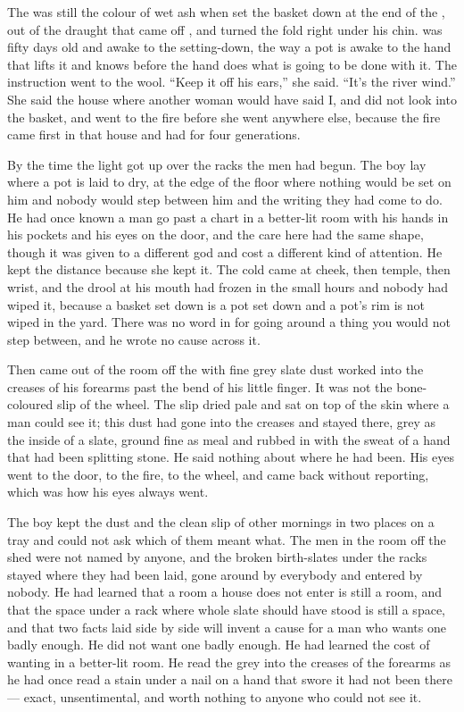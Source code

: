 
The  was still the colour of wet ash when  set the basket down at the end of the , out of the draught that came off , and turned the fold right under his chin.  was fifty days old and awake to the setting-down, the way a pot is awake to the hand that lifts it and knows before the hand does what is going to be done with it. The instruction went to the wool. “Keep it off his ears,” she said. “It's the river wind.” She said the house where another woman would have said I, and did not look into the basket, and went to the fire before she went anywhere else, because the fire came first in that house and had for four generations.

By the time the light got up over the racks the men had begun. The boy lay where a pot is laid to dry, at the edge of the floor where nothing would be set on him and nobody would step between him and the writing they had come to do. He had once known a man go past a chart in a better-lit room with his hands in his pockets and his eyes on the door, and the care here had the same shape, though it was given to a different god and cost a different kind of attention. He kept the distance because she kept it. The cold came at cheek, then temple, then wrist, and the drool at his mouth had frozen in the small hours and nobody had wiped it, because a basket set down is a pot set down and a pot's rim is not wiped in the yard. There was no word in  for going around a thing you would not step between, and he wrote no cause across it.

Then  came out of the room off the  with fine grey slate dust worked into the creases of his forearms past the bend of his little finger. It was not the bone-coloured slip of the wheel. The slip dried pale and sat on top of the skin where a man could see it; this dust had gone into the creases and stayed there, grey as the inside of a slate, ground fine as meal and rubbed in with the sweat of a hand that had been splitting stone. He said nothing about where he had been. His eyes went to the door, to the fire, to the wheel, and came back without reporting, which was how his eyes always went.

The boy kept the dust and the clean slip of other mornings in two places on a tray and could not ask which of them meant what. The men in the room off the shed were not named by anyone, and the broken birth-slates under the racks stayed where they had been laid, gone around by everybody and entered by nobody. He had learned that a room a house does not enter is still a room, and that the space under a rack where whole slate should have stood is still a space, and that two facts laid side by side will invent a cause for a man who wants one badly enough. He did not want one badly enough. He had learned the cost of wanting in a better-lit room. He read the grey into the creases of the forearms as he had once read a stain under a nail on a hand that swore it had not been there --- exact, unsentimental, and worth nothing to anyone who could not see it.

